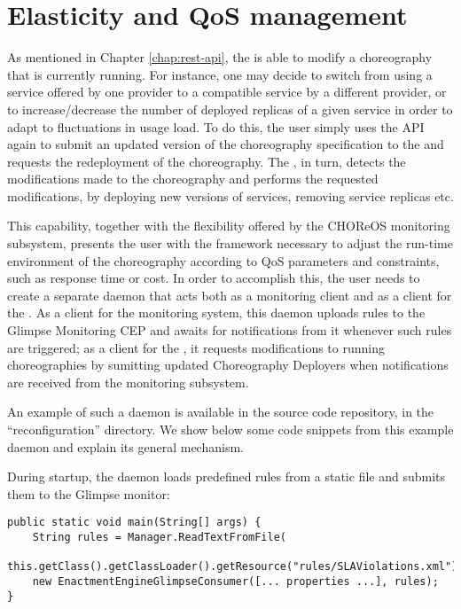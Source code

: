 \chapter{Elasticity and QoS management}

As mentioned in Chapter \ref{chap:rest-api}, the \ee is able to modify a
choreography that is currently running.
%
For instance, one may decide to switch from using a service offered by one
provider to a compatible service by a different provider, or to
increase/decrease the number of deployed replicas of a given service in order
to adapt to fluctuations in usage load.
%
To do this, the user simply uses the API again to submit an updated version of the
choreography specification to the \ee and requests the redeployment of the
choreography.
%
The \ee, in turn, detects the modifications made to the choreography and
performs the requested modifications, by deploying new versions of services,
removing service replicas etc.

This capability, together with the flexibility offered by the CHOReOS
monitoring subsystem, presents the user with the framework necessary to adjust
the run-time environment of the choreography according to QoS parameters and
constraints, such as response time or cost.
%
In order to accomplish this, the user needs to create a separate daemon that
acts both as a monitoring client and as a client for the \ee.
%
As a client for the monitoring system, this daemon uploads rules to the
Glimpse Monitoring CEP and awaits for notifications from it whenever such
rules are triggered;
%
as a client for the \ee, it requests modifications to running choreographies
by sumitting updated Choreography Deployers when notifications are received
from the monitoring subsystem.

An example of such a daemon is available in the \ee source code repository,
in the ``reconfiguration'' directory. We show below some code snippets from
this example daemon and explain its general mechanism.

During startup, the daemon loads predefined rules from a static file and
submits them to the Glimpse monitor:

\begin{verbatim}
public static void main(String[] args) {
    String rules = Manager.ReadTextFromFile(
        this.getClass().getClassLoader().getResource("rules/SLAViolations.xml").getFile());
    new EnactmentEngineGlimpseConsumer([... properties ...], rules);
}
\end{verbatim}

